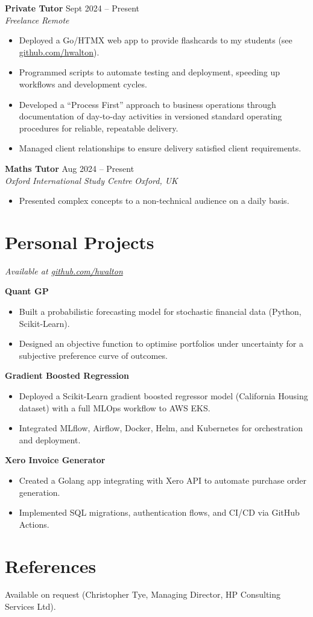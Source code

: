 \documentclass[a4paper,10pt]{article}
\newcommand{\resumeSubheading}[4]{
  \vspace{1pt}\textbf{#1} \hfill #2 \\
  \textit{#3} \hfill \textit{#4}
}
\newcommand{\resumeItem}[1]{\item{#1}}
\newcommand{\resumeItemListStart}{\begin{itemize}[leftmargin=*,itemsep=0pt,parsep=0pt]}
\newcommand{\resumeItemListEnd}{\end{itemize}\vspace{-3pt}}
\begin{document}
\resumeSubheading{Private Tutor}{Sept 2024 -- Present}{Freelance}{Remote}
\resumeItemListStart
  \resumeItem{Deployed a Go/HTMX web app to provide flashcards to my students (see \href{https://github.com/hwalton/flashcard-app-showcase}{github.com/hwalton}).}
  \resumeItem{Programmed scripts to automate testing and deployment, speeding up workflows and development cycles.}
  \resumeItem{Developed a ``Process First'' approach to business operations through documentation of day-to-day activities in versioned standard operating procedures for reliable, repeatable delivery.}
  \resumeItem{Managed client relationships to ensure delivery satisfied client requirements.}
\resumeItemListEnd

\resumeSubheading{Maths Tutor}{Aug 2024 -- Present}{Oxford International Study Centre}{Oxford, UK}
\resumeItemListStart
  \resumeItem{Presented complex concepts to a non-technical audience on a daily basis.}
\resumeItemListEnd

\section{Personal Projects}
\hfill\textit{Available at \href{https://github.com/hwalton}{github.com/hwalton}}

\textbf{Quant GP}
\resumeItemListStart
  \resumeItem{Built a probabilistic forecasting model for stochastic financial data (Python, Scikit-Learn).}
  \resumeItem{Designed an objective function to optimise portfolios under uncertainty for a subjective preference curve of outcomes.}
\resumeItemListEnd

\textbf{Gradient Boosted Regression}
\resumeItemListStart
  \resumeItem{Deployed a Scikit-Learn gradient boosted regressor model (California Housing dataset) with a full MLOps workflow to AWS EKS.}
  \resumeItem{Integrated MLflow, Airflow, Docker, Helm, and Kubernetes for orchestration and deployment.}
\resumeItemListEnd

\textbf{Xero Invoice Generator}
\resumeItemListStart
  \resumeItem{Created a Golang app integrating with Xero API to automate purchase order generation.}
  \resumeItem{Implemented SQL migrations, authentication flows, and CI/CD via GitHub Actions.}
\resumeItemListEnd

\section{References}
Available on request (Christopher Tye, Managing Director, HP Consulting Services Ltd).
\end{document}
